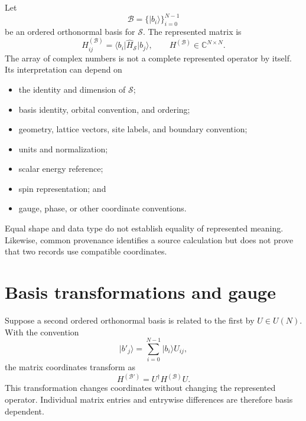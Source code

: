 Let
\begin{equation}
  \mathcal B=\{\lvert b_i\rangle\}_{i=0}^{N-1}
\end{equation}
be an ordered orthonormal basis for $\mathcal S$. The represented matrix is
\begin{equation}
  H^{(\mathcal B)}_{ij}
  =
  \langle b_i\lvert\widehat H_{\mathcal S}\rvert b_j\rangle,
  \qquad
  H^{(\mathcal B)}\in\mathbb C^{N\times N}.
\end{equation}
The array of complex numbers is not a complete represented operator by itself.
Its interpretation can depend on

\begin{itemize}
  \item the identity and dimension of $\mathcal S$;
  \item basis identity, orbital convention, and ordering;
  \item geometry, lattice vectors, site labels, and boundary convention;
  \item units and normalization;
  \item scalar energy reference;
  \item spin representation; and
  \item gauge, phase, or other coordinate conventions.
\end{itemize}

Equal shape and data type do not establish equality of represented meaning.
Likewise, common provenance identifies a source calculation but does not prove
that two records use compatible coordinates.

\section{Basis transformations and gauge}


Suppose a second ordered orthonormal basis is related to the first by
$U\in U(N)$. With the convention
\begin{equation}
  \lvert b'_j\rangle
  =
  \sum_{i=0}^{N-1}\lvert b_i\rangle U_{ij},
\end{equation}
the matrix coordinates transform as
\begin{equation}
  H^{(\mathcal B')}
  =
  U^{\dagger}H^{(\mathcal B)}U.
\end{equation}
This transformation changes coordinates without changing the represented
operator. Individual matrix entries and entrywise differences are therefore
basis dependent.

